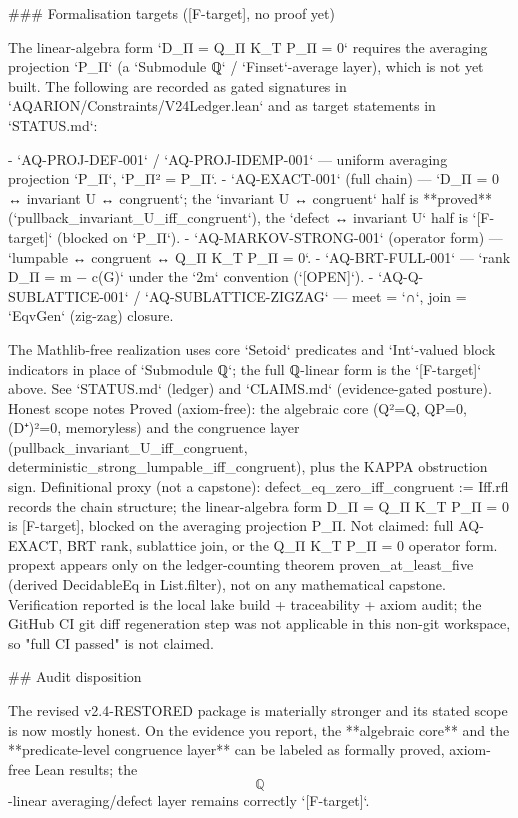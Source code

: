### Formalisation targets ([F-target], no proof yet)

The linear-algebra form `D_Π = Q_Π K_T P_Π = 0` requires the averaging projection
`P_Π` (a `Submodule ℚ` / `Finset`-average layer), which is not yet built. The
following are recorded as gated signatures in `AQARION/Constraints/V24Ledger.lean`
and as target statements in `STATUS.md`:

- `AQ-PROJ-DEF-001` / `AQ-PROJ-IDEMP-001` — uniform averaging projection `P_Π`, `P_Π² = P_Π`.
- `AQ-EXACT-001` (full chain) — `D_Π = 0 ↔ invariant U ↔ congruent`; the
  `invariant U ↔ congruent` half is **proved** (`pullback_invariant_U_iff_congruent`),
  the `defect ↔ invariant U` half is `[F-target]` (blocked on `P_Π`).
- `AQ-MARKOV-STRONG-001` (operator form) — `lumpable ↔ congruent ↔ Q_Π K_T P_Π = 0`.
- `AQ-BRT-FULL-001` — `rank D_Π = m − c(G)` under the `2m` convention (`[OPEN]`).
- `AQ-Q-SUBLATTICE-001` / `AQ-SUBLATTICE-ZIGZAG` — meet = `∩`, join = `EqvGen` (zig-zag) closure.

The Mathlib-free realization uses core `Setoid` predicates and `Int`-valued block
indicators in place of `Submodule ℚ`; the full ℚ-linear form is the `[F-target]`
above. See `STATUS.md` (ledger) and `CLAIMS.md` (evidence-gated posture).
Honest scope notes
Proved (axiom-free): the algebraic core (Q²=Q, QP=0, (D⁺)²=0, memoryless) and the congruence layer (pullback_invariant_U_iff_congruent, deterministic_strong_lumpable_iff_congruent), plus the KAPPA obstruction sign.
Definitional proxy (not a capstone): defect_eq_zero_iff_congruent := Iff.rfl records the chain structure; the linear-algebra form D_Π = Q_Π K_T P_Π = 0 is [F-target], blocked on the averaging projection P_Π.
Not claimed: full AQ-EXACT, BRT rank, sublattice join, or the Q_Π K_T P_Π = 0 operator form.
propext appears only on the ledger-counting theorem proven_at_least_five (derived DecidableEq in List.filter), not on any mathematical capstone.
Verification reported is the local lake build + traceability + axiom audit; the GitHub CI git diff regeneration step was not applicable in this non-git workspace, so "full CI passed" is not claimed.

## Audit disposition

The revised v2.4-RESTORED package is materially stronger and its stated scope is now mostly honest. On the evidence you report, the **algebraic core** and the **predicate-level congruence layer** can be labeled as formally proved, axiom-free Lean results; the $$\mathbb Q$$-linear averaging/defect layer remains correctly `[F-target]`.

